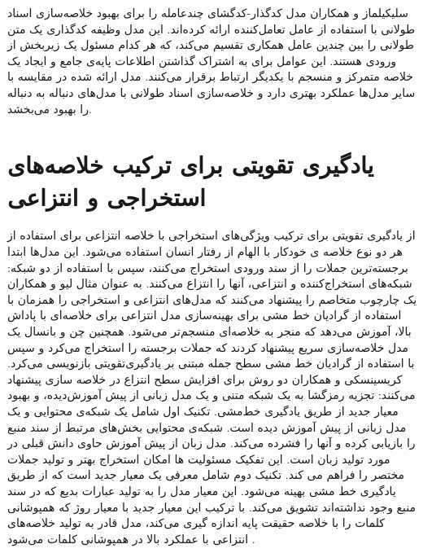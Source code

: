 سلیکیلماز
 و همکاران مدل کدگذار-کدگشای چندعامله را برای بهبود خلاصه‌سازی اسناد طولانی با استفاده از عامل تعامل‌کننده
 ارائه کرده‌اند. این مدل وظیفه کدگذاری یک متن طولانی را بین چندین عامل همکاری تقسیم می‌کند، که هر کدام مسئول یک زیربخش از ورودی هستند. این عوامل برای به اشتراک گذاشتن اطلاعات پایه‌ی جامع و ایجاد یک خلاصه متمرکز و منسجم با یکدیگر ارتباط برقرار می‌کنند.  مدل ارائه شده در مقایسه با سایر مدل‌ها عملکرد بهتری دارد و خلاصه‌سازی اسناد طولانی با مدل‌های دنباله به دنباله را بهبود می‌بخشد.
\section{یادگیری تقویتی برای ترکیب خلاصه‌های استخراجی و انتزاعی} 
  از یادگیری تقویتی برای ترکیب ویژگی‌های استخراجی با خلاصه انتزاعی برای استفاده از هر دو نوع خلاصه ی خودکار با الهام از رفتار انسان استفاده می‌شود. این مدل‌ها ابتدا برجسته‌ترین جملات را از سند ورودی استخراج می‌کنند، سپس با استفاده از دو شبکه: شبکه‌های استخراج‌کننده و انتزاعی، آنها را انتزاع می‌کنند. به عنوان مثال لیو
   و همکاران یک چارچوب متخاصم را پیشنهاد می‌کنند که مدل‌های انتزاعی و استخراجی را همزمان با استفاده از گرادیان خط ‌مشی برای بهینه‌سازی مدل انتزاعی برای خلاصه‌ای با پاداش بالا، آموزش می‌دهد که منجر به خلاصه‌ای منسجم‌تر می‌شود\cite{liu2018generative}.
  همچنین چن و بانسال
   یک مدل خلاصه‌سازی سریع پیشنهاد کردند که جملات برجسته را استخراج می‌کرد و سپس با استفاده از گرادیان خط مشی سطح جمله مبتنی بر یادگیری‌تقویتی بازنویسی می‌کرد\cite{chen2018fast}.
کریسینسکی 
و همکاران  دو روش برای افزایش سطح انتزاع در خلاصه سازی  پیشنهاد می‌کنند: تجزیه رمزگشا به یک شبکه متنی و یک مدل زبانی از پیش آموزش‌دیده، و بهبود معیار جدید از طریق یادگیری خط‌مشی.
تکنیک اول شامل یک شبکه‌ی محتوایی
 و یک مدل زبانی از پیش آموزش دیده است. شبکه‌ی محتوایی  بخش‌های مرتبط از سند منبع را بازیابی کرده و آنها را فشرده می‌کند. مدل زبان از پیش آموزش حاوی دانش قبلی در مورد تولید زبان است. این تفکیک مسئولیت ها امکان استخراج بهتر و تولید جملات مختصر را فراهم می کند.
 تکنیک دوم شامل معرفی یک معیار جدید است که از طریق یادگیری خط مشی بهینه می‌شود. این معیار مدل را به تولید عبارات بدیع که در سند   منبع وجود نداشته‌اند تشویق می‌کند. با ترکیب این معیار جدید با معیار روژ که همپوشانی کلمات را با خلاصه حقیقت پایه اندازه گیری می‌کند، مدل قادر به تولید خلاصه‌های انتزاعی با عملکرد بالا در همپوشانی کلمات می‌شود \cite{kryscinski-etal-2018-improving}.

